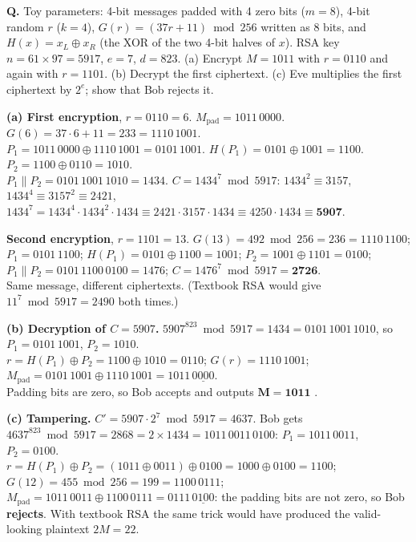 \begin{worked}
\textbf{Q.} Toy parameters: 4-bit messages padded with 4 zero bits ($m = 8$), 4-bit random $r$ ($k = 4$), $G(r) = (37r + 11) \bmod 256$ written as 8 bits, and $H(x) = x_L \oplus x_R$ (the XOR of the two 4-bit halves of $x$). RSA key $n = 61 \times 97 = 5917$, $e = 7$, $d = 823$. (a) Encrypt $M = 1011$ with $r = 0110$ and again with $r = 1101$. (b) Decrypt the first ciphertext. (c) Eve multiplies the first ciphertext by $2^e$; show that Bob rejects it.

\textbf{(a) First encryption}, $r = 0110 = 6$. $M_{\text{pad}} = 1011\,0000$. $G(6) = 37 \cdot 6 + 11 = 233 = 1110\,1001$.\\
$P_1 = 1011\,0000 \oplus 1110\,1001 = 0101\,1001$. \;$H(P_1) = 0101 \oplus 1001 = 1100$. \;$P_2 = 1100 \oplus 0110 = 1010$.\\
$P_1 \| P_2 = 0101\,1001\,1010 = 1434$. \;$C = 1434^7 \bmod 5917$: $1434^2 \equiv 3157$, $1434^4 \equiv 3157^2 \equiv 2421$, $1434^7 = 1434^4 \cdot 1434^2 \cdot 1434 \equiv 2421 \cdot 3157 \cdot 1434 \equiv 4250 \cdot 1434 \equiv \mathbf{5907}$.

\textbf{Second encryption}, $r = 1101 = 13$. $G(13) = 492 \bmod 256 = 236 = 1110\,1100$; $P_1 = 0101\,1100$; $H(P_1) = 0101 \oplus 1100 = 1001$; $P_2 = 1001 \oplus 1101 = 0100$; $P_1 \| P_2 = 0101\,1100\,0100 = 1476$; $C = 1476^7 \bmod 5917 = \mathbf{2726}$.\\
Same message, different ciphertexts. (Textbook RSA would give $11^7 \bmod 5917 = 2490$ both times.)

\textbf{(b) Decryption of $C = 5907$.} $5907^{823} \bmod 5917 = 1434 = 0101\,1001\,1010$, so $P_1 = 0101\,1001$, $P_2 = 1010$.\\
$r = H(P_1) \oplus P_2 = 1100 \oplus 1010 = 0110$; \;$G(r) = 1110\,1001$; \;$M_{\text{pad}} = 0101\,1001 \oplus 1110\,1001 = 1011\,\underline{0000}$.\\
Padding bits are zero, so Bob accepts and outputs $\mathbf{M = 1011}$ \checkmark.

\textbf{(c) Tampering.} $C' = 5907 \cdot 2^7 \bmod 5917 = 4637$. Bob gets $4637^{823} \bmod 5917 = 2868 = 2 \times 1434 = 1011\,0011\,0100$: $P_1 = 1011\,0011$, $P_2 = 0100$.\\
$r = H(P_1) \oplus P_2 = (1011 \oplus 0011) \oplus 0100 = 1000 \oplus 0100 = 1100$; \;$G(12) = 455 \bmod 256 = 199 = 1100\,0111$;\\
$M_{\text{pad}} = 1011\,0011 \oplus 1100\,0111 = 0111\,\underline{0100}$: the padding bits are not zero, so Bob \textbf{rejects}. With textbook RSA the same trick would have produced the valid-looking plaintext $2M = 22$.
\end{worked}

